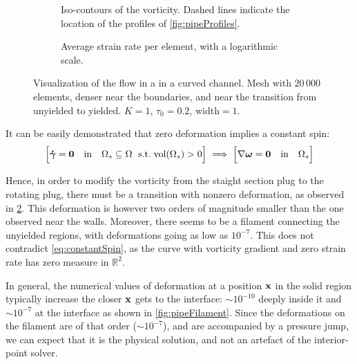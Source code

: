 \documentclass[11 pt]{report}
\begin{document}
\begin{figure}[!b]
    \centering
    \begin{subfigure}[t]{\textwidth}
        
        \caption{Iso-contours of the vorticity. Dashed lines indicate the location of the profiles of \cref{fig:pipeProfiles}.}
        \label{fig:pipeVorticity}
    \end{subfigure}
    \begin{subfigure}[t]{\textwidth}
        
        \caption{Average strain rate per element, with a logarithmic scale.}
        \label{fig:pipeStrain}
    \end{subfigure}
    \caption{Visualization of the flow in a in a curved channel. Mesh with $20\,000$ elements, denser near the boundaries, and near the transition from unyielded to yielded. $K=1$, $\tau_0=0.2$, $\text{width}=1$.}
    \label{fig:pipe}
\end{figure}

It can be easily demonstrated that zero deformation implies a constant spin:
\begin{equation}
    \Big[ \boldsymbol{\dot \gamma} = \mathbf{0} \quad\text{in}\quad \Omega_s \subseteq \Omega  \;\text{ s.t.}\; \textrm{vol}(\Omega_s) > 0 \Big] \implies \Big[ \nabla \boldsymbol\omega = \mathbf{0} \quad\text{in}\quad \Omega_s\Big]
    \label{eq:constantSpin}
\end{equation}

Hence, in order to modify the vorticity from the staight section plug to the rotating plug, there must be a transition with nonzero deformation, as observed in \cref{fig:pipeStrain}. This deformation is however two orders of magnitude smaller than the one observed near the walls. Moreover, there seems to be a filament connecting the unyielded regions, with deformations going as low as $10^{-7}$. This does not contradict \cref{eq:constantSpin}, as the curve with vorticity gradient and zero strain rate has zero measure in $\mathbb{R}^2$.

In general, the numerical values of deformation at a position $\mathbf{x}$ in the solid region typically increase the closer $\mathbf{x}$ gets to the interface: $\sim 10^{-10}$ deeply inside it and $\sim 10^{-7}$ at the interface as shown in \cref{fig:pipeFilament}. Since the deformations on the filament are of that order ($\sim 10^{-7}$), and are accompanied by a pressure jump, we can expect that it is the physical solution, and not an artefact of the interior-point solver.
\end{document}
